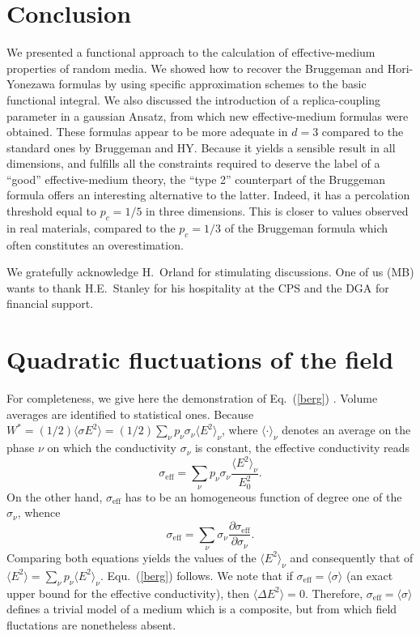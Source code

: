 \section{Conclusion}
\label{c}

We presented a functional approach to the calculation of
effective-medium properties of random media. We showed how to recover
the Bruggeman and Hori-Yonezawa formulas by using specific
approximation schemes to the basic functional integral. We also
discussed the introduction of a replica-coupling parameter in a
gaussian Ansatz, from which new effective-medium formulas were
obtained. These formulas appear to be more adequate in $d=3$ compared
to the standard ones by Bruggeman and HY. Because it yields a
sensible result in all dimensions, and fulfills all the constraints
required to deserve the label of a ``good'' effective-medium theory,
the ``type 2'' counterpart of the Bruggeman formula offers an
interesting alternative to the latter. Indeed, it has a percolation
threshold equal to $p_c=1/5$ in three dimensions. This is closer to
values observed in real materials, compared to the $p_c=1/3$ of the
Bruggeman formula which often constitutes an overestimation.

\acknowledgements

We gratefully acknowledge H.~Orland for stimulating discussions. One
of us (MB) wants to thank H.E.~Stanley for his hospitality at the CPS
and the DGA for financial support.

\appendix
\section{Quadratic fluctuations of the field}
\label{qfotf}
For completeness, we give here the demonstration of Eq.\ (\ref{berg})
\cite{BERG78}. Volume averages are identified to statistical ones.
Because $W^*=(1/2)\langle \sigma E^2\rangle =(1/2)\sum_\nu p_\nu
\sigma_\nu \langle E^2\rangle_\nu$, where $\langle \cdot \rangle_\nu$
denotes an average on the phase $\nu$ on which the conductivity
$\sigma_\nu$ is constant, the effective conductivity reads
\begin{equation}
\sigma_{\text{eff}}=\sum_\nu p_\nu \sigma_\nu \frac{\langle E^2\rangle_\nu}{E_0^2}.
\end{equation}
On the other hand, $\sigma_{\text{eff}}$ has to be an homogeneous
function of degree one of the $\sigma_\nu$, whence
\begin{equation}
\sigma_{\text{eff}}=\sum_\nu \sigma_\nu \frac{\partial \sigma_{\text{eff}}}{\partial \sigma_\nu}.
\end{equation}
Comparing both equations yields the values of the
$\langle E^2\rangle_\nu$ and consequently that of $\langle E^2\rangle
=\sum_\nu p_\nu \langle E^2\rangle_\nu$. Equ.\ (\ref{berg}) follows.
We note that if $\sigma_{\text{eff}}=\langle\sigma\rangle$ (an exact
upper bound for the effective conductivity), then
$\langle \Delta E^2\rangle=0$. Therefore, $\sigma_{\text{eff}}=\langle\sigma\rangle$ defines a trivial model
of a medium which is a composite, but from which field fluctations
are nonetheless absent.


